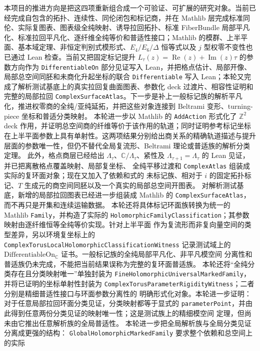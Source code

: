 \documentclass[UTF8,fontset=none,a4paper,11pt]{ctexart}
\begin{document}
本项目的推进方向是把这四项重新组合成一个可验证、可扩展的研究对象。当前已经完成自包含的拓扑、连续性、同伦闭包和标记商，并在 Mathlib 层完成标准同伦、实际复图表、图表级全纯映射、诱导拉回拓扑、标准 FiberBundle 局部平凡化、标准拉回平凡化、逐纤维全纯等价和普适性接口；Mathlib 的模群、上半平面、基本域定理、非恒定判别式模形式、$E_4/E_6/\Delta$ 恒等式以及 $j$ 型权零不变性也已通过 Lean 检查。当前又把固定标记提升 \(L_\tau(z)=\operatorname{Re}(z)+\operatorname{Im}(z)\tau\) 的参数方向作为 \texttt{DifferentiableOn} 部分见证写入 Lean，并把格点估计、局部开像、局部总空间同胚和未商化升起坐标的联合 \texttt{Differentiable} 写入 Lean；本轮又完成了解析测试基底上的真实拉回复曲面图表、参数化 deck 过渡片、相容性证明和完整的局部拉回 \texttt{ComplexSurfaceAtlas}。下一步是补上一般标记族的解析平凡化，推进权零商的全纯/亚纯延拓，并把这些对象连接到 Beltrami 变形、turning-piece 坐标和普适分类映射。
本轮进一步以 Mathlib 的 \texttt{AddAction} 形式化了 \(\mathbb Z^2\) deck 作用，并证明总空间商的纤维等价于该作用的轨道；同时证明参考标记坐标在上半平面参数上具有单射性。这两项结果分别给出商关系的精确轨道描述与提升层面的参数唯一性，但仍不替代全局复流形、Beltrami 理论或普适族的解析分类定理。
此外，格点商层已经给出 $\Lambda_\tau$、$\mathbb C/\Lambda_\tau$、紧性及
$\Lambda_{\tau+1}=\Lambda_\tau$ 的 Lean 见证，并已把离散格点覆盖映射、局部复坐标、
全纯平移过渡和 \texttt{ComplexAtlas} 组装成实际的复环面对象；现在又加入了依赖和式的
未标记族、相对于 $i$ 的固定拓扑标记、$T$ 生成元的商空间同胚以及一个真实的局部总空间开图表。
对解析测试基底，新增的局部拉回图表已经进一步组装成 Mathlib 的
\texttt{ComplexSurfaceAtlas}，而不再只是开集和连续运输数据。
本轮还将具体标记环面族转换为统一的 Mathlib \texttt{Family}，并构造了实际的
\texttt{HolomorphicFamilyClassification}；其参数映射由逐纤维恒等全纯等价实现。针对上半平面
作为复流形而非复向量空间的类型差异，另以环境复坐标上的
\texttt{ComplexTorusLocalHolomorphicClassificationWitness} 记录测试域上的
\(\mathrm{DifferentiableOn}_{\mathbb C}\) 证书。一般标记族的全纯局部平凡化、非平凡模空间
分离性和普适族仍未完成，不能把当前结果误称为完整的复环面普适族。
本轮还将“全纯分类存在且分类映射唯一”单独封装为
\texttt{FineHolomorphicUniversalMarkedFamily}，并将已证明的坐标单射性封装为
\texttt{ComplexTorusParameterRigidityWitness}；二者分别是精细普适性接口与环面参数分离性的
明确形式化对象。本轮进一步证明：对于任意局部拉回环面分类见证，分类映射都等于显式的
\texttt{parameterPoint}，并由此得到任意两份分类见证的映射唯一性；这是测试族上的精细模空间
定理，但尚未由它推出任意解析族的全局普适性。
本轮进一步把全局解析族与全局分类见证分离成更强的结构：
\texttt{GlobalHolomorphicMarked\allowbreak Family} 要求整个依赖和总空间上的实际
\end{document}

